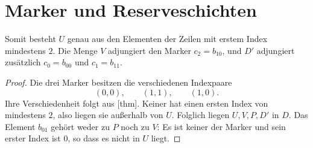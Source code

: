 \documentclass[main.tex]{subfiles}
\begin{document}
\section{Marker und Reserveschichten}


Somit besteht \(U\) genau aus den Elementen der Zeilen mit erstem Index
mindestens \(2\). Die Menge \(V\) adjungiert den Marker \(c_2=b_{10}\),
und \(D'\) adjungiert zusätzlich \(c_0=b_{00}\) und \(c_1=b_{11}\).


\begin{proof}
Die drei Marker besitzen die verschiedenen Indexpaare
\[
  (0,0),\qquad(1,1),\qquad(1,0).
\]
Ihre Verschiedenheit folgt aus
[thm]. Keiner hat einen ersten
Index von mindestens \(2\), also liegen sie außerhalb von \(U\). Folglich
liegen \(U,V,P,D'\) in \(D\). Das Element \(b_{01}\) gehört weder zu
\(P\) noch zu \(V\): Es ist keiner der Marker und sein erster Index ist
\(0\), so dass es nicht in \(U\) liegt.
\end{proof}
\end{document}
